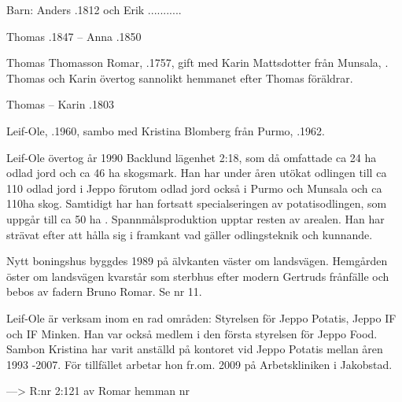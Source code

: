 Barn:  Anders  .1812 och Erik \textborn ...........

Thomas .1847  --  Anna .1850


Thomas Thomasson Romar, .1757,  gift med Karin Mattsdotter från Munsala, . Thomas och Karin övertog sannolikt hemmanet efter Thomas föräldrar.
\begin{jhchildren}
  \item {}
\end{jhchildren}

Thomas   --  Karin .1803



Leif-Ole, .1960, sambo med Kristina Blomberg från Purmo, .1962.

\begin{jhchildren}
  \item {}
  \item {}
\end{jhchildren}
Leif-Ole övertog år 1990 Backlund lägenhet 2:18, som då omfattade ca 24 ha odlad jord och ca 46 ha skogsmark. Han har under åren utökat odlingen till ca 110 odlad jord i Jeppo förutom odlad jord också i Purmo och Munsala och ca 110ha skog. Samtidigt har han fortsatt specialseringen av potatisodlingen, som uppgår till ca 50 ha . Spannmålsproduktion upptar resten av arealen. Han har strävat efter att hålla sig i framkant vad gäller odlingsteknik och kunnande.

Nytt boningshus byggdes 1989 på älvkanten väster om landsvägen. Hemgården öster om landsvägen kvarstår som sterbhus efter modern Gertruds frånfälle och bebos av fadern Bruno Romar. Se nr 11.

Leif-Ole är verksam inom en rad områden: Styrelsen för Jeppo Potatis, Jeppo IF och IF Minken. Han var också medlem i den första styrelsen för Jeppo Food. Sambon Kristina har varit anställd på kontoret vid Jeppo Potatis mellan åren 1993 -2007. För tillfället arbetar hon fr.om. 2009 på Arbetskliniken i Jakobstad.


--->  R:nr 2:121 av Romar hemman nr 


